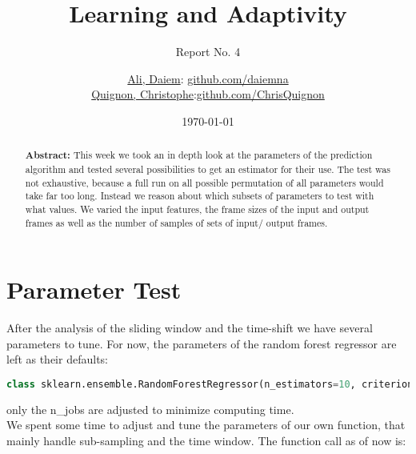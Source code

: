 \documentclass{scrartcl}
\begin{document}
\title{Learning and Adaptivity}
\subtitle{Report No. 4}
\author{
  \href{daiem.ali@smail.inf.h-brs.de}{Ali, Daiem}: \href{https://github.com/daiemna}{github.com/daiemna}\\
  \href{christophe.quignon@smail.inf.h-brs.de}{Quignon, Christophe}:\href{https://github.com/ChrisQuignon}{github.com/ChrisQuignon}
}
\date{\today}


\maketitle



\begin{abstract}
\textbf{Abstract:}
This week we took an in depth look at the parameters of the prediction algorithm and tested several possibilities to get an estimator for their use. The test was not exhaustive, because a full run on all possible permutation of all parameters would take far too long. Instead we reason about which subsets of parameters to test with what values. We varied the input features, the frame sizes of the input and output frames as well as the number of samples of sets of input/ output frames. 
\end{abstract}

\section{Parameter Test}
\label{sec:parameter}
After the analysis of the sliding window and the time-shift we have several parameters to tune. For now, the parameters of the random forest regressor are left as their defaults:
\begin{lstlisting}[language=Python]
class sklearn.ensemble.RandomForestRegressor(n_estimators=10, criterion='mse', max_depth=None, min_samples_split=2, min_samples_leaf=1, min_weight_fraction_leaf=0.0, max_features='auto', max_leaf_nodes=None, bootstrap=True, oob_score=False, n_jobs=1, random_state=None, verbose=0, warm_start=False)
\end{lstlisting}

only  the n\_jobs are adjusted to minimize computing time.\\
We spent some time to adjust and tune the parameters of our own function, that mainly handle sub-sampling and the time window. The function call as of now is:
\end{document}
